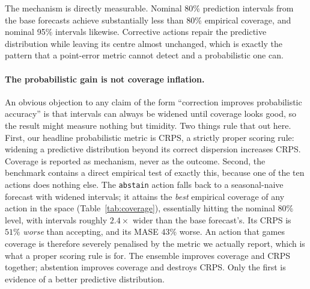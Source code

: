 The mechanism is directly measurable. Nominal 80\% prediction intervals from the base
forecasts achieve substantially less than 80\% empirical coverage, and nominal 95\%
intervals likewise. Corrective actions repair the predictive distribution while leaving
its centre almost unchanged, which is exactly the pattern that a point-error metric
cannot detect and a probabilistic one can.

\paragraph{The probabilistic gain is not coverage inflation.}
An obvious objection to any claim of the form ``correction improves probabilistic
accuracy'' is that intervals can always be widened until coverage looks good, so the
result might measure nothing but timidity. Two things rule that out here. First, our
headline probabilistic metric is CRPS, a strictly proper scoring rule: widening a
predictive distribution beyond its correct dispersion increases CRPS. Coverage is
reported as mechanism, never as the outcome. Second, the benchmark contains a direct
empirical test of exactly this, because one of the ten actions does nothing else. The
\texttt{abstain} action falls back to a seasonal-naive forecast with widened intervals;
it attains the \emph{best} empirical coverage of any action in the space
(Table~\ref{tab:coverage}), essentially hitting the nominal 80\% level, with intervals
roughly $2.4\times$ wider than the base forecast's. Its CRPS is $51\%$ \emph{worse} than
accepting, and its MASE $43\%$ worse. An action that games coverage is therefore
severely penalised by the metric we actually report, which is what a proper scoring rule
is for. The ensemble improves coverage and CRPS together; abstention improves coverage
and destroys CRPS. Only the first is evidence of a better predictive distribution.

\begin{table}[htbp]
\centering
\caption{Interval coverage and CRPS by action, on the instances where each action
applies. CRPS is paired against accepting on those same instances. The base forecast is
badly over-confident; the ensemble repairs coverage and CRPS together. \texttt{abstain}
is the control for the objection that probabilistic gains can be manufactured by
widening intervals: it achieves the best coverage in the action space with intervals
roughly $2.4\times$ wider, and is penalised heavily on CRPS for it.}
\label{tab:coverage}
\small
\fittable{}
\end{table}


